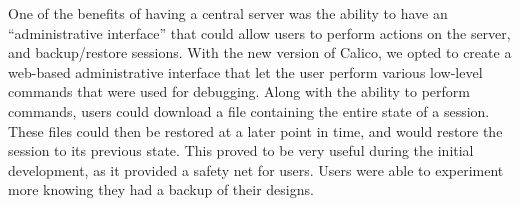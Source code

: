 One of the benefits of having a central server was the ability to have an ``administrative interface'' that could allow users to perform actions on the server, and backup/restore sessions. With the new version of Calico, we opted to create a web-based administrative interface that let the user perform various low-level commands that were used for debugging. Along with the ability to perform commands, users could download a file containing the entire state of a session. These files could then be restored at a later point in time, and would restore the session to its previous state. This proved to be very useful during the initial development, as it provided a safety net for users. Users were able to experiment more knowing they had a backup of their designs.
